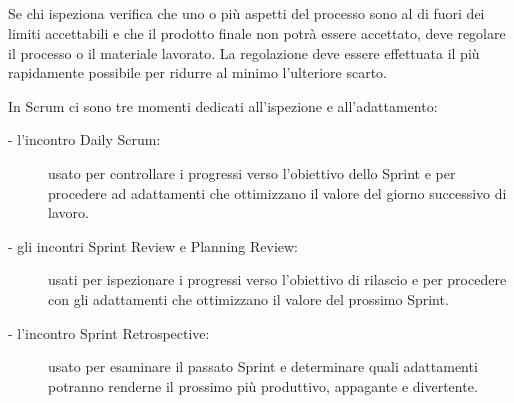 \subsection*{\color{Blue}{LA TERZA  COLONNA \`E  L'ADATTAMENTO}}
Se chi  ispeziona verifica che uno o pi\`u aspetti del processo sono al di fuori dei limiti accettabili 
e che il prodotto finale non potr\`a essere accettato, deve regolare il processo o il
materiale lavorato.  La regolazione  deve essere  effettuata il  pi\`u rapidamente
possibile per ridurre al minimo l'ulteriore scarto.

In Scrum ci sono tre momenti dedicati all'ispezione e all'adattamento:
\begin{description}
\item[- l'incontro Daily  Scrum:]
	usato per controllare i progressi verso l'obiettivo dello Sprint e per procedere ad
	adattamenti  che  ottimizzano il  valore  del giorno  successivo  di lavoro.
\item[- gli incontri Sprint Review e  Planning Review:]
	usati per ispezionare i progressi  verso l'obiettivo di rilascio e per procedere con gli
	adattamenti che ottimizzano il valore del prossimo Sprint.
\item[- l'incontro Sprint Retrospective:]
	usato  per  esaminare il passato Sprint e determinare quali
	adattamenti potranno renderne il prossimo pi\`u produttivo, appagante  e
	divertente.
\end{description}